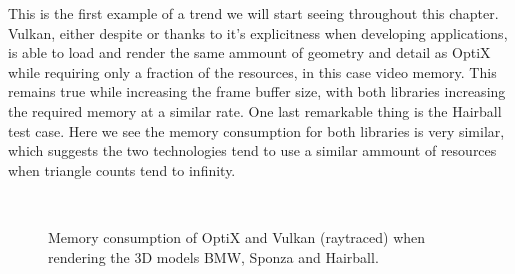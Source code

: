 This is the first example of a trend we will start seeing throughout this chapter. Vulkan, either despite or thanks to it's explicitness when developing applications, is able to load and render the same ammount of geometry and detail as OptiX while requiring only a fraction of the resources, in this case video memory. This remains true while increasing the frame buffer size, with both libraries increasing the required memory at a similar rate. One last remarkable thing is the Hairball test case. Here we see the memory consumption for both libraries is very similar, which suggests the two technologies tend to use a similar ammount of resources when triangle counts tend to infinity.

\begin{figure}
    \\
    \centering
    \caption{Memory consumption of OptiX and Vulkan (raytraced) when rendering the 3D models BMW, Sponza and Hairball.}
    \label{memory-usage-raytraced-comparison-graph}
\end{figure}

